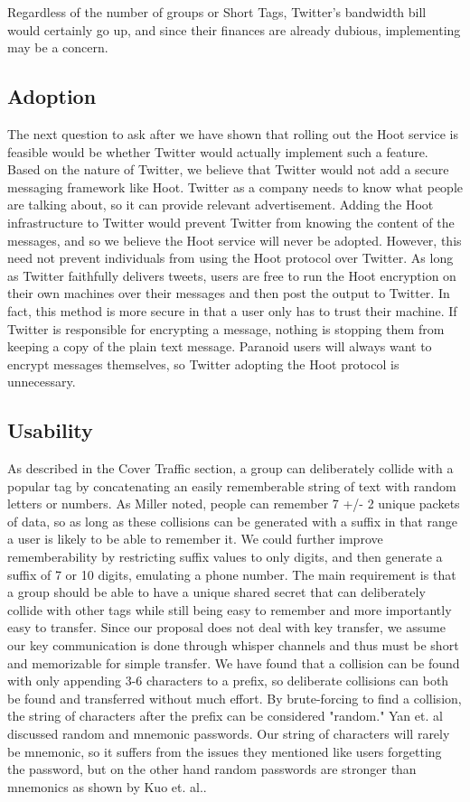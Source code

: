 Regardless of the number of groups or Short Tags, Twitter's bandwidth bill would certainly go up, and since their finances are already dubious, implementing \hoot may be a concern.

\subsection{Adoption}	

The next question to ask after we have shown that rolling out the Hoot service is feasible would be whether Twitter would actually implement such a feature. Based on the nature of Twitter, we believe that Twitter would not add a secure messaging framework like Hoot. Twitter as a company needs to know what people are talking about, so it can provide relevant advertisement. Adding the Hoot infrastructure to Twitter would prevent Twitter from knowing the content of the messages, and so we believe the Hoot service will never be adopted. However, this need not prevent individuals from using the Hoot protocol over Twitter. As long as Twitter faithfully delivers tweets, users are free to run the Hoot encryption on their own machines over their messages and then post the output to Twitter. In fact, this method is more secure in that a user only has to trust their machine. If Twitter is responsible for encrypting a message, nothing is stopping them from keeping a copy of the plain text message. Paranoid users will always want to encrypt messages themselves, so Twitter adopting the Hoot protocol is unnecessary.
		
\subsection{Usability}

As described in the Cover Traffic section, a group can deliberately collide with a popular tag by concatenating an easily rememberable string of text with random letters or numbers. As Miller\cite{miller56} noted, people can remember  
7 +/- 2 unique packets of data, so as long as these collisions can be generated with a suffix in that range a user is likely to be able to remember it. We could further improve rememberability by restricting suffix values to only digits, and then generate a suffix of 7 or 10 digits, emulating a phone number. The main requirement is that a group should be able to have a unique shared secret that can deliberately collide with other tags while still being easy to remember and more importantly easy to transfer. Since our proposal does not deal with key transfer, we assume our key communication is done through whisper channels and thus must be short and memorizable for simple transfer. We have found that a collision can be found with only appending 3-6 characters to a prefix, so deliberate collisions can both be found and transferred without much effort. By brute-forcing to find a collision, the string of characters after the prefix  can be considered "random." Yan et. al\cite{yan00} discussed random and mnemonic passwords. Our string of characters will rarely be mnemonic, so it suffers from the issues they mentioned like users forgetting the password, but on the other hand random passwords are stronger than mnemonics as shown by Kuo et. al.\cite{passwords06}.

